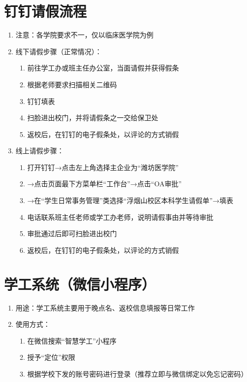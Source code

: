 \section[钉钉请假流程]{钉钉请假流程\footnotemark}
\begin{enumerate}
    \item 注意：各学院要求不一，仅以临床医学院为例
    \item 线下请假步骤（正常情况）：
    \begin{enumerate}
        \item 前往学工办或班主任办公室，当面请假并获得假条
        \item 根据老师要求扫描相关二维码
        \item 钉钉填表
        \item 扫脸进出校门，并将请假条之一交给保卫处
        \item 返校后，在钉钉的电子假条处，以评论的方式销假
    \end{enumerate}
    \item 线上请假步骤：
    \begin{enumerate}
        \item 打开钉钉→点击左上角选择主企业为“潍坊医学院”
        \item →点击页面最下方菜单栏“工作台”→点击“OA审批”
        \item →在“学生日常事务管理”类选择“浮烟山校区本科学生请假单”→填表
        \item 电话联系班主任老师或学工办老师，说明请假事由并等待审批
        \item 审批通过后即可扫脸进出校门
        \item 返校后，在钉钉的电子假条处，以评论的方式销假
    \end{enumerate}
\end{enumerate}

\section[学工系统（微信小程序）]{学工系统（微信小程序）}
\begin{enumerate}
    \item 用途：学工系统主要用于晚点名、返校信息填报等日常工作\footnotemark
    \item 使用方式：
    \begin{enumerate}
        \item 在微信搜索“智慧学工”小程序
        \item 授予“定位”权限
        \item 根据学校下发的账号密码进行登录（推荐立即与微信绑定以免忘记密码）
    \end{enumerate}
\end{enumerate}

